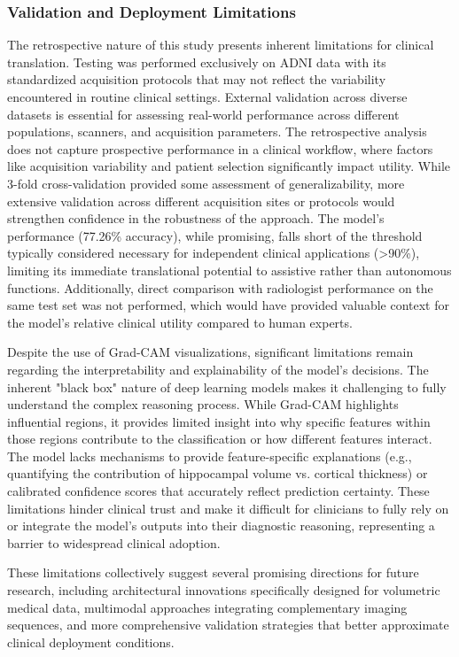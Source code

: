 \documentclass[11pt, a4paper]{article}
\begin{document}
\subsubsection{Validation and Deployment Limitations}

The retrospective nature of this study presents inherent limitations for clinical translation. Testing was performed exclusively on ADNI data with its standardized acquisition protocols that may not reflect the variability encountered in routine clinical settings. External validation across diverse datasets is essential for assessing real-world performance across different populations, scanners, and acquisition parameters. The retrospective analysis does not capture prospective performance in a clinical workflow, where factors like acquisition variability and patient selection significantly impact utility. While 3-fold cross-validation provided some assessment of generalizability, more extensive validation across different acquisition sites or protocols would strengthen confidence in the robustness of the approach. The model's performance (77.26\% accuracy), while promising, falls short of the threshold typically considered necessary for independent clinical applications (>90\%), limiting its immediate translational potential to assistive rather than autonomous functions. Additionally, direct comparison with radiologist performance on the same test set was not performed, which would have provided valuable context for the model's relative clinical utility compared to human experts.

Despite the use of Grad-CAM visualizations, significant limitations remain regarding the interpretability and explainability of the model's decisions. The inherent "black box" nature of deep learning models makes it challenging to fully understand the complex reasoning process. While Grad-CAM highlights influential regions, it provides limited insight into why specific features within those regions contribute to the classification or how different features interact. The model lacks mechanisms to provide feature-specific explanations (e.g., quantifying the contribution of hippocampal volume vs. cortical thickness) or calibrated confidence scores that accurately reflect prediction certainty. These limitations hinder clinical trust and make it difficult for clinicians to fully rely on or integrate the model's outputs into their diagnostic reasoning, representing a barrier to widespread clinical adoption.

These limitations collectively suggest several promising directions for future research, including architectural innovations specifically designed for volumetric medical data, multimodal approaches integrating complementary imaging sequences, and more comprehensive validation strategies that better approximate clinical deployment conditions.
\end{document}
